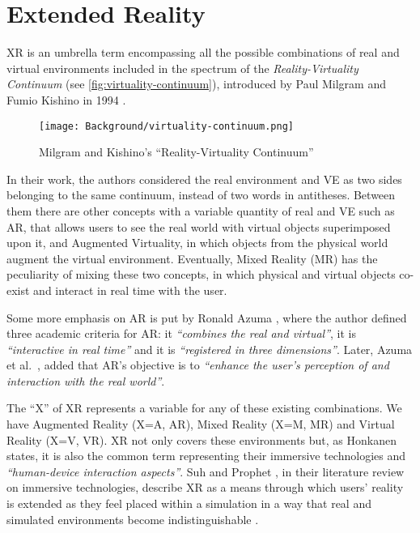 \section{Extended Reality}
\label{sec:background-intro}

\gls{XR} is an umbrella term encompassing all the possible combinations of real and virtual environments included in the spectrum of the \emph{Reality-Virtuality Continuum} (see \autoref{fig:virtuality-continuum}), introduced by Paul Milgram and Fumio Kishino in 1994 \cite{milgram_taxonomy_1994}.

\begin{figure}[h]
	\centering
	\texttt{[image: Background/virtuality-continuum.png]}
	\caption{Milgram and Kishino's “Reality-Virtuality Continuum”}
	\label{fig:virtuality-continuum}
\end{figure}
In their work, the authors considered the real environment and \gls{VE} as two sides belonging to the same continuum, instead of two words in antitheses. Between them there are other concepts with a variable quantity of real and VE such as \gls{AR}, that allows users to see the real world with virtual objects superimposed upon it, and Augmented Virtuality, in which objects from the physical world augment the virtual environment. Eventually, Mixed Reality (MR) has the peculiarity of mixing these two concepts, in which physical and virtual objects co-exist and interact in real time with the user.

Some more emphasis on AR is put by Ronald Azuma \cite{azuma1997survey}, where the author defined three academic criteria for AR: it \textit{“combines the real and virtual”}, it is \textit{“interactive in real time”} and it is \textit{“registered in three dimensions”}. Later, Azuma et al.~\cite{azuma2001recent}, added that AR's objective is to \textit{“enhance the user’s perception of and interaction with the real world”}.

The “X” of XR represents a variable for any of these existing combinations. We have Augmented Reality (X=A, AR), Mixed Reality (X=M, MR) and Virtual Reality (X=V, VR). XR not only covers these environments but, as Honkanen \cite{honkanen_enhancing_2018} states, it is also the common term representing their immersive technologies and \textit{“human-device interaction aspects”}. Suh and Prophet \cite{suh_state_2018}, in their literature review on immersive technologies, describe XR as a means through which users' reality is extended as they feel placed within a simulation in a way that real and simulated environments become indistinguishable \cite{kwok_covid-19_2020}.

